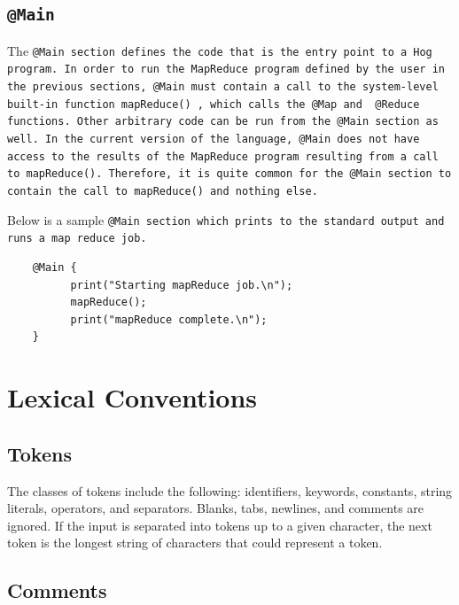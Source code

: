 \documentclass{report}
\begin{document}

\subsection{\tt @Main \rm} %
\label{sec:tt_main_rm}

The \tt @Main \rm section defines the code that is the entry point to a Hog
program. In order to run the MapReduce program defined by the user in the
previous sections, \tt @Main \rm must contain a call to the system-level
built-in function \tt mapReduce() \rm, which calls the \tt @Map \rm and \tt
@Reduce \rm functions. Other arbitrary code can be run from the \tt @Main \rm
section as well. In the current version of the language, \tt @Main \rm does not
have access to the results of the MapReduce program resulting from a call to
\tt mapReduce()\rm. Therefore, it is quite common for the \tt @Main \rm section
to contain the call to \tt mapReduce() \rm and nothing else.

Below is a sample \tt @Main \rm section which prints to the standard output and
runs a map reduce job.

\begin{verbatim}
    @Main {
          print("Starting mapReduce job.\n");
          mapReduce();
          print("mapReduce complete.\n");
    }
\end{verbatim}




\section{Lexical Conventions} %
\label{sec:lexical_conventions}

\subsection{Tokens} %
\label{sub:tokens}

The classes of tokens include the following: identifiers, keywords,
constants, string literals, operators, and separators. Blanks, tabs, newlines, and
comments are ignored. If the input is separated into tokens up to a given
character, the next token is the longest string of characters that could represent
a token.


\subsection{Comments} %
\label{sub:comments}
\end{document}
